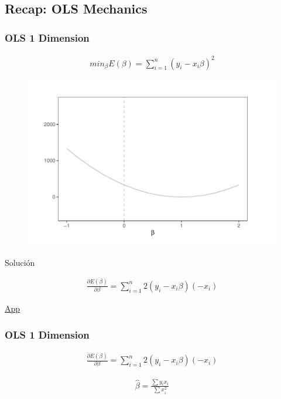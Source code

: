 \documentclass[
  shownotes,
  xcolor={svgnames},
  hyperref={colorlinks,citecolor=DarkBlue,linkcolor=andesred,urlcolor=DarkBlue}
  , aspectratio=169]{beamer}
\begin{document}
\subsection{Recap: OLS Mechanics}
\begin{frame}[fragile]
\frametitle{OLS 1 Dimension}
\footnotesize
\begin{align}
 min_{\beta} E(\beta)=\sum_{i=1}^n (y_i-x_i \beta)^2 
\end{align}
   \begin{figure}[H] \centering
            \captionsetup{justification=centering}
              \includegraphics[scale=0.4]{figures/lasso0.pdf}
 \end{figure}

Solución

\begin{align}
\frac{\partial E(\beta)}{\partial \beta}= \sum_{i=1}^n 2(y_i-x_i \beta)(-x_i )
\end{align}

\href{https://cede.uniandes.edu.co/OLS/}{App}

\end{frame}
\begin{frame}[fragile]
\frametitle{OLS 1 Dimension}
\begin{align}
\frac{\partial E(\beta)}{\partial \beta}= \sum_{i=1}^n 2(y_i-x_i \beta)(-x_i )
\end{align}

\begin{align}
\hat{\beta} = \frac{\sum y_ix_i}{\sum x^2_i}
\end{align}
\end{frame}
\end{document}
